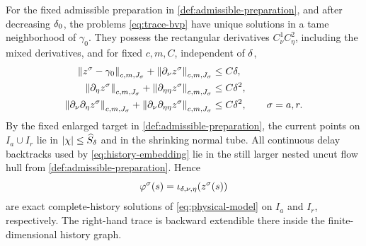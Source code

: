 \begin{theorem}
\label{thm:canonical-traces}
For the fixed admissible preparation in \cref{def:admissible-preparation},
and after decreasing \(\delta_0\), the problems
\cref{eq:trace-bvp} have unique solutions in a tame neighborhood of
\(\gamma_0\).  They possess the rectangular derivatives
\(C_\nu^1C_\eta^2\), including the mixed derivatives, and for fixed
\(c,m,C\), independent of \(\delta\),
\begin{equation}
\label{eq:trace-estimates}
\begin{aligned}
 \left\lVert z^\sigma-\gamma_0\right\rVert_{c,m,J_\sigma}
 +\left\lVert \partial_\nu z^\sigma\right\rVert_{c,m,J_\sigma}&\le C\delta,\\
 \left\lVert \partial_\eta z^\sigma\right\rVert_{c,m,J_\sigma}
 +\left\lVert \partial_{\eta\eta}z^\sigma\right\rVert_{c,m,J_\sigma}&\le C\delta^2,\\
 \left\lVert \partial_\nu\partial_\eta z^\sigma\right\rVert_{c,m,J_\sigma}
 +\left\lVert \partial_\nu\partial_{\eta\eta}z^\sigma\right\rVert_{c,m,J_\sigma}
 &\le C\delta^2,\qquad \sigma=a,r.
\end{aligned}
\end{equation}
By the fixed enlarged target in \cref{def:admissible-preparation}, the
current points on \(I_a\cup I_r\) lie in
\(\left\lvert \chi\right\rvert\le\widehat S_\delta\) and in the shrinking
normal tube.  All continuous delay backtracks used by
\cref{eq:history-embedding} lie in the still larger nested uncut flow hull
from \cref{def:admissible-preparation}.  Hence
\begin{equation}
\label{eq:lifted-traces}
 \varphi^\sigma(s)=\iota_{\delta,\nu,\eta}(z^\sigma(s))
\end{equation}
are exact complete-history solutions of \cref{eq:physical-model} on
\(I_a\) and \(I_r\), respectively.  The right-hand trace is backward
extendible there
inside the finite-dimensional history graph.
\end{theorem}

